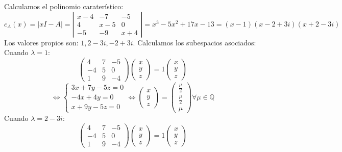 \documentclass{article}
\begin{document}
Calculamos el polinomio caraterístico:
$$
c_A(x) = |xI-A| = 
\left| \begin{array}{ccc}
    x-4 & -7 & -5\\
    4 & x-5 & 0\\
    -5 & -9 & x+4
\end{array} \right| =
x^3-5x^2+17x-13 = (x-1)(x-2+3i)(x+2-3i)
$$
Los valores propios son: $1,2-3i,-2+3i$. Calculamos los subespacios asociados:\\
Cuando $\lambda=1$:
$$
\left( \begin{array}{ccc}
    4 & 7 & -5\\
    -4 & 5 & 0\\
    1 & 9 & -4
\end{array} \right)
\left( \begin{array}{c}
      x \\
      y \\
      z
\end{array} \right) = 1
\left( \begin{array}{c}
      x \\
      y \\
      z
\end{array} \right)
$$
$$
\Leftrightarrow \left\{ \begin{array}{c}
     3x+7y-5z =0  \\
     -4x+4y =0  \\
     x+9y-5z =0
\end{array} \right.
\Leftrightarrow \left( \begin{array}{c}
      x \\
      y \\
      z
\end{array} \right) =
\left( \begin{array}{c}
      \frac{\mu}{2} \\
      \frac{\mu}{2} \\
      \mu
\end{array} \right) \forall \mu \in \mathbb{Q}
$$
Cuando $\lambda=2-3i$:
$$
\left( \begin{array}{ccc}
    4 & 7 & -5\\
    -4 & 5 & 0\\
    1 & 9 & -4
\end{array} \right)
\left( \begin{array}{c}
      x \\
      y \\
      z
\end{array} \right) = 1
\left( \begin{array}{c}
      x \\
      y \\
      z
\end{array} \right)
$$
\end{document}
